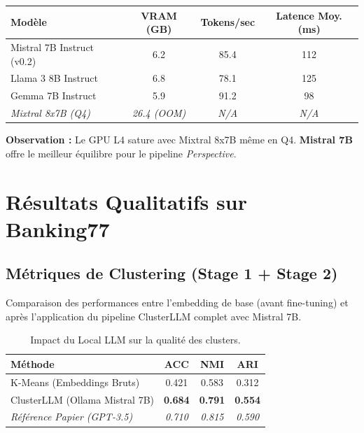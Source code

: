 \documentclass[11pt, a4paper]{article}
\begin{document}
\begin{center}
\begin{tabular}{lccc}
\toprule
\textbf{Modèle} & \textbf{VRAM (GB)} & \textbf{Tokens/sec} & \textbf{Latence Moy. (ms)} \\
\midrule
Mistral 7B Instruct (v0.2) & 6.2 & 85.4 & 112 \\
Llama 3 8B Instruct & 6.8 & 78.1 & 125 \\
Gemma 7B Instruct & 5.9 & 91.2 & 98 \\
\textit{Mixtral 8x7B (Q4)} & \textit{26.4 (OOM)} & \textit{N/A} & \textit{N/A} \\
\bottomrule
\end{tabular}
\end{center}

\textbf{Observation :} Le GPU L4 sature avec Mixtral 8x7B même en Q4. \textbf{Mistral 7B} offre le meilleur équilibre pour le pipeline \textit{Perspective}.

\section{Résultats Qualitatifs sur Banking77}

\subsection{Métriques de Clustering (Stage 1 + Stage 2)}
Comparaison des performances entre l'embedding de base (avant fine-tuning) et après l'application du pipeline ClusterLLM complet avec Mistral 7B.

\begin{table}[H]
\centering
\begin{tabular}{@{}lccc@{}}
\toprule
\textbf{Méthode} & \textbf{ACC} & \textbf{NMI} & \textbf{ARI} \\ \midrule
K-Means (Embeddings Bruts) & 0.421 & 0.583 & 0.312 \\
ClusterLLM (Ollama Mistral 7B) & \textbf{0.684} & \textbf{0.791} & \textbf{0.554} \\
\textit{Référence Papier (GPT-3.5)} & \textit{0.710} & \textit{0.815} & \textit{0.590} \\ \bottomrule
\end{tabular}
\caption{Impact du Local LLM sur la qualité des clusters.}
\end{table}
\end{document}
